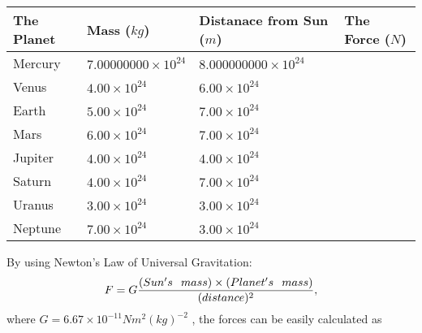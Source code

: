 \documentclass[12pt]{article}
\begin{document}
\vspace{0.2in}
 
 
\begin{tabular}{|l|l|l|l|}
\hline
The Planet & Mass ($kg$) & Distanace from Sun ($m$) & The Force ($N$)\\
\hline
Mercury  &
           $ %
7.00000000 \times 10^{24} $   &
             $ %
8.000000000 \times 10^{24} $    &
\\  \hline
Venus    &
           $ %
4.00 \times 10^{24} $    &
             $ %
6.00 \times 10^{24} $    &
\\  \hline
Earth    &
           $ %
5.00 \times 10^{24} $    &
             $ %
7.00 \times 10^{24} $    &
\\   \hline
Mars     &
           $ %
6.00 \times 10^{24} $    &
             $ %
7.00 \times 10^{24} $    &
\\   \hline
Jupiter  &
           $ %
4.00 \times 10^{24} $    &
             $ %
4.00 \times 10^{24} $    &
\\  \hline
Saturn   &
           $ %
4.00 \times 10^{24}$    &
             $ %
7.00 \times 10^{24}$    &
\\  \hline
Uranus   &
           $ %
3.00 \times 10^{24} $    &
             $ %
3.00 \times 10^{24} $    &
\\  \hline
Neptune  &
           $ %
7.00 \times 10^{24} $    &
             $ %
3.00 \times 10^{24} $    &
\\  \hline
 
\end{tabular}
 
 
 
 
\noindent{}
 
 

By using Newton's Law of Universal Gravitation:
\[
F=G \frac{(Sun's \hspace{0.1in} mass) \times (Planet's \hspace{0.1in} mass)} { (distance)^2},
\]
where
$ G= %
6.67 \times 10^{-11}N m^{2}(kg)^{-2}$ , the forces can be easily calculated as
 
\vspace{0.2in}
 
\end{document}
